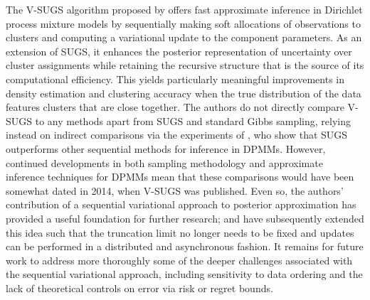 \documentclass{uwstat572}
\begin{document}
The V-SUGS algorithm proposed by \cite{zhang} offers fast approximate inference in Dirichlet process mixture models by sequentially making soft allocations of observations to clusters and computing a variational update to the component parameters. As an extension of SUGS, it enhances the posterior representation of uncertainty over cluster assignments while retaining the recursive structure that is the source of its computational efficiency. This yields particularly meaningful improvements in density estimation and clustering accuracy when the true distribution of the data features clusters that are close together. The authors do not directly compare V-SUGS to any methods apart from SUGS and standard Gibbs sampling, relying instead on indirect comparisons via the experiments of \cite{wang}, who show that SUGS outperforms other sequential methods for inference in DPMMs. However, continued developments in both sampling methodology and approximate inference techniques for DPMMs mean that these comparisons would have been somewhat dated in 2014, when V-SUGS was published. Even so, the authors' contribution of a sequential variational approach to posterior approximation has provided a useful foundation for further research; \cite{lin} and \cite{campbell} have subsequently extended this idea such that the truncation limit no longer needs to be fixed and updates can be performed in a distributed and asynchronous fashion. It remains for future work to address more thoroughly some of the deeper challenges associated with the sequential variational approach, including sensitivity to data ordering and the lack of theoretical controls on error via risk or regret bounds. 

\newpage


\end{document}

